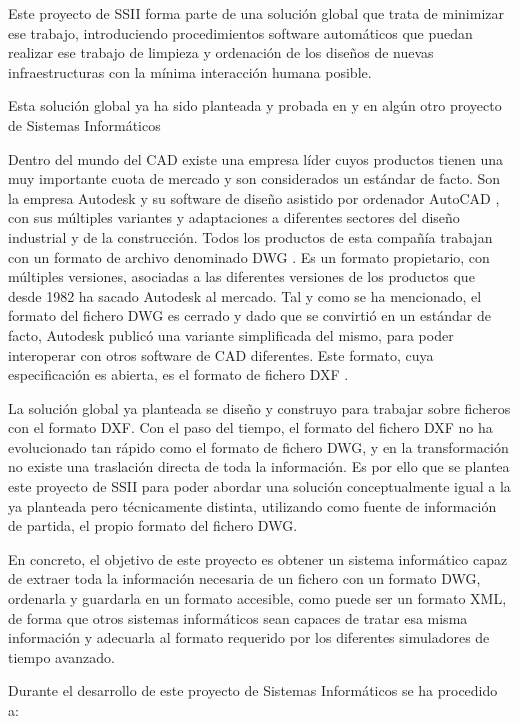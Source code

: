 Este proyecto de SSII forma parte de una solución global que trata de minimizar ese trabajo, introduciendo procedimientos software automáticos que puedan realizar ese trabajo de limpieza y ordenación de los diseños de nuevas infraestructuras con la mínima interacción humana posible.

Esta solución global ya ha sido planteada y probada en \cite{Miguel-Munoz} y en algún otro proyecto de Sistemas Informáticos \cite{Miguel-Munoz-SSII} \cite{Javier-Cabrera-SSII}

Dentro del mundo del CAD existe una empresa líder cuyos productos tienen una muy importante cuota de mercado y son considerados un estándar de facto. Son la empresa Autodesk y su software de diseño asistido por ordenador AutoCAD , con sus múltiples variantes y adaptaciones a diferentes sectores del diseño industrial y de la construcción. Todos los productos de esta compañía trabajan con un formato de archivo denominado DWG \cite{DWG-file-history}. Es un formato propietario, con múltiples versiones, asociadas a las diferentes versiones de los productos que desde 1982 ha sacado Autodesk al mercado. Tal y como se ha mencionado, el formato del fichero DWG es cerrado y dado que se convirtió en un estándar de facto, Autodesk publicó una variante simplificada del mismo, para poder interoperar con otros software de CAD diferentes. Este formato, cuya especificación es abierta, es el formato de fichero DXF \cite{DXF-file-history}. 

La solución global ya planteada \cite{Miguel-Munoz} se diseño y construyo para trabajar sobre ficheros con el formato DXF. Con el paso del tiempo, el formato del fichero DXF no ha evolucionado tan rápido como el formato de fichero DWG, y en la transformación no existe una traslación directa de toda la información. Es por ello que se plantea este proyecto de SSII para poder abordar una solución conceptualmente igual a la ya planteada pero técnicamente distinta, utilizando como fuente de información de partida, el propio formato del fichero DWG.

En concreto, el objetivo de este proyecto es obtener un sistema informático capaz de extraer toda la información necesaria de un fichero con un formato DWG, ordenarla y guardarla en un formato accesible, como puede ser un formato XML, de forma que otros sistemas informáticos sean capaces de tratar esa misma información y adecuarla al formato requerido por los diferentes simuladores de tiempo avanzado. 

Durante el desarrollo de este proyecto de Sistemas Informáticos se ha procedido a:

